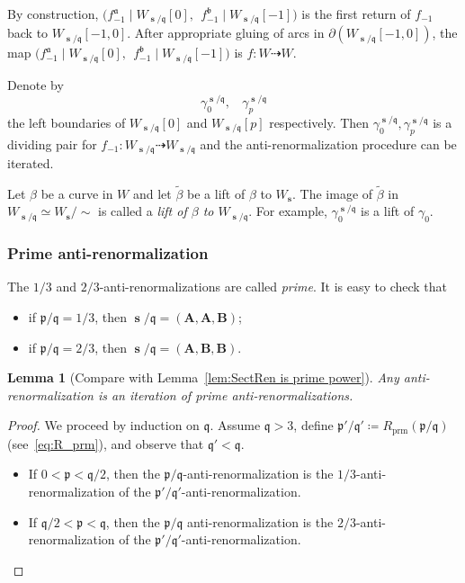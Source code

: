 \documentclass[]{amsart}
\renewcommand{\sp}{{\ \ }}
\newcommand\prm{{\operatorname{prm}}}
\newcommand\cRRc{R_{\prm}}%
\newcommand\seq{{\operatorname{\mathbf s}}}
\newcommand{\pp}{\mathfrak{p}}
\renewcommand{\aa}{{\mathfrak{a}}}
\newcommand{\bb}{{\mathfrak{b}}}
\renewcommand{\qq}{\mathfrak{q}}
\newcommand{\A}{\mathbf A}
\newcommand{\B}{\mathbf B}
\newtheorem{lem}[thm]{Lemma}
\theoremstyle{remark}
\numberwithin{equation}{section}
\theoremstyle{definition}
\begin{document}
By construction, $(f_{-1}^\aa\mid W_{\seq/\qq}[0],\sp{ f_{-1}^\bb\mid W_{\seq/\qq}[-1])}$ is the first return 
of $f_{-1}$ back to $W_{\seq/\qq}[-1,0]$. After appropriate gluing of arcs in $\partial \left(W_{\seq/\qq}[-1,0]\right)$, the map ${(f_{-1}^\aa\mid W_{\seq/\qq}[0],\sp{ f_{-1}^\bb\mid W_{\seq/\qq}[-1])}}$ is $f\colon W\dashrightarrow W$.

Denote by 
\begin{equation}
\label{eq:ap:gammas seq qq} 
\gamma_0^{\seq/\qq},\sp\sp \gamma_p^{\seq/\qq}
\end{equation}
 the left boundaries of $W_{\seq/\qq}[0]$ and $W_{\seq/\qq}[p]$ respectively. Then $\gamma_0^{\seq/\qq}, \gamma_p^{\seq/\qq}$ is a dividing pair for   $f_{-1}\colon W_{\seq/\qq}\dashrightarrow W_{\seq/\qq}$ and the anti-renormalization procedure can be iterated. 


Let $\beta$ be a curve in $W$ and let $\widetilde \beta$ be a lift of $\beta$ to $W_\seq$. The image of $\widetilde \beta$ in $W_{\seq/\qq}\simeq W_\seq/\sim$ is called a \emph{lift of $\beta$ to $W_{\seq/\qq}$}. For example, $\gamma_0^{\seq/\qq}$ is a lift of $\gamma_0$.


\subsubsection{Prime anti-renormalization}
\label{sss:PrimeAntiRen}
 The $1/3$ and $2/3$-anti-renormalizations are called \emph{prime}. It is easy to check that 
\begin{itemize}
\item if $\pp/\qq=1/3$, then $\seq/\qq=(\A,\A,\B)$;
\item if $\pp/\qq=2/3$, then $\seq/\qq=(\A,\B,\B)$.
\end{itemize}

\begin{lem}[Compare with Lemma~\ref{lem:SectRen is prime power}]
\label{lem:AntiRen is prime power}
Any anti-renormalization is an iteration of prime anti-renormalizations.
\end{lem}
\begin{proof}
We proceed by induction on $\qq$. Assume $\qq>3$, define $\pp'/\qq'\coloneqq \cRRc(\pp/\qq)$ (see~\eqref{eq:R_prm}), and observe that $\qq'<\qq$.
\begin{itemize}
\item  If $0<\pp<\qq/2$, then the $\pp/\qq$-anti-renormalization is the $1/3$-anti-renormalization of the $\pp'/\qq'$-anti-renormalization.
\item  If $\qq/2<\pp<\qq$, then the $\pp/\qq$ anti-renormalization is the $2/3$-anti-renormalization of the $\pp'/\qq'$-anti-renormalization.
\end{itemize}
\end{proof}
\end{document}
